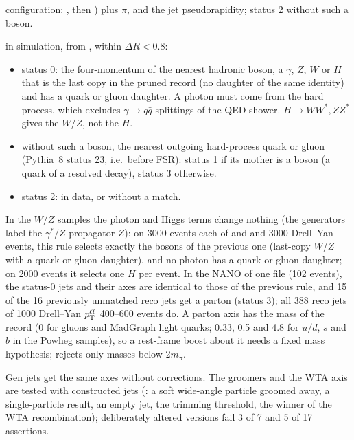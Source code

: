 \begin{description}[style=nextline]
  configuration: , then ) plus $\pi$, and the jet pseudorapidity; status 2 without such a boson.
\item[\code{axisTruth}] in simulation, from , within $\Delta R < 0.8$:
  \begin{itemize}
  \item status 0: the four-momentum of the nearest hadronic boson, a $\gamma$, $Z$, $W$ or $H$ that is the last copy
    in the pruned record (no daughter of the same identity) and has a quark or gluon daughter. A photon must come from
    the hard process, which excludes $\gamma\to q\bar q$ splittings of the QED shower. $H\to WW^*, ZZ^*$ gives the
    $W$/$Z$, not the $H$.
  \item without such a boson, the nearest outgoing hard-process quark or gluon (Pythia~8 status 23, i.e.\ before
    FSR): status 1 if its mother is a boson (a quark of a resolved decay), status 3 otherwise.
  \item status 2: in data, or without a match.
  \end{itemize}
  In the $W$/$Z$ samples the photon and Higgs terms change nothing (the generators label the $\gamma^*/Z$ propagator
  $Z$): on 3000 events each of  and  and 3000
  Drell--Yan events, this rule selects exactly the bosons of the previous one (last-copy $W$/$Z$ with a quark or
  gluon daughter), and no photon has a quark or gluon daughter; on 2000  events it selects
  one $H$ per event. In the NANO of one  file (102 events), the status-0 jets and their axes are
  identical to those of the previous rule, and 15 of the 16 previously unmatched reco jets get a parton (status 3);
  all 388 reco jets of 1000 Drell--Yan $p_{\mathrm{T}}^{\ell\ell}$ 400--600\GeV{} events do. A parton axis has the mass of the
  record (0 for gluons and MadGraph light quarks; 0.33, 0.5 and 4.8\GeV{} for $u/d$, $s$ and $b$ in the Powheg samples),
  so a rest-frame boost about it needs a fixed mass hypothesis;  rejects only masses below
  $2m_\pi$.
\end{description}
Gen jets get the same axes without corrections. The groomers and the WTA axis are tested with constructed jets
(: a soft wide-angle particle groomed away, a single-particle result, an empty jet,
the trimming threshold, the winner of the WTA recombination); deliberately altered versions fail 3 of 7 and 5 of 17
assertions.

